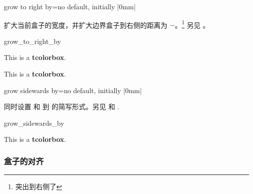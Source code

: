 \begin{docTcbKey}{grow to right by}{=}{no default, initially |0mm|}

  扩大当前盒子的宽度，并扩大边界盒子到右侧的距离为
  $-$。\footnote{突出到右侧了} 另见 。
\begin{exdispExample}[safety=2cm]{grow_to_right_by}

\begin{tcolorbox}[grow to right by=2cm,enhanced,show bounding box]
This is a \textbf{tcolorbox}.
\end{tcolorbox}

\bigskip

\begin{tcolorbox}[grow to right by=2cm,grow to left by=1cm,
  enhanced,show bounding box]
This is a \textbf{tcolorbox}.
\end{tcolorbox}
\end{exdispExample}
\end{docTcbKey}



\begin{docTcbKey}[][doc new=2018-03-22]{grow sidewards by}{=}{no default, initially |0mm|}

同时设置  和  到 的简写形式。另见  和 .
\begin{exdispExample}[safety=2cm]{grow_sidewards_by}

\begin{tcolorbox}[grow sidewards by=2cm,enhanced,show bounding box]
This is a \textbf{tcolorbox}.
\end{tcolorbox}
\end{exdispExample}
\end{docTcbKey}



\subsubsection{盒子的对齐}

